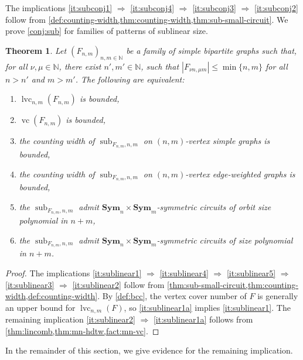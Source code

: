 \documentclass[11pt, DIV=15]{scrarticle}
\theoremstyle{definition}
\theoremstyle{plain}
\newtheorem{theorem}[definition]{Theorem}
\theoremstyle{remark}
\DeclareMathOperator{\sub}{sub}
\DeclareMathOperator{\vc}{vc}
\DeclareMathOperator{\cc}{lvc}
\newcommand{\Sym}{\mathbf{Sym}}
\begin{document}
	The implications \ref{it:subconj1} $\Rightarrow$ \ref{it:subconj4} $\Rightarrow$ \ref{it:subconj3} $\Rightarrow$ \ref{it:subconj2} follow from \cref{def:counting-width,thm:counting-width,thm:sub-small-circuit}.
	We prove \cref{conj:sub} for families of patterns of sublinear size.
	\begin{theorem}
		\label{thm:sublinear}
		Let $(F_{n,m})_{n,m \in \mathbb{N}}$ be a family of simple bipartite graphs such that, 
		for all $\nu, \mu \in \mathbb{N}$,
		there exist $n',m' \in \mathbb{N}$,
		such that $|F_{\nu n, \mu m}| \leq \min \{n,m\}$ for all $n > n'$ and $m > m'$.
		The following are equivalent:
		\begin{enumerate}
			\item $\cc_{n,m}(F_{n,m})$ is bounded,\label{it:sublinear1}
			\item $\vc(F_{n,m})$ is bounded,\label{it:sublinear1a}
			\item the counting width of $\sub_{F_{n,m},n,m}$ on $(n,m)$-vertex simple graphs is bounded,\label{it:sublinear2}
			\item the counting width of $\sub_{F_{n,m},n,m}$ on $(n,m)$-vertex edge-weighted graphs is bounded,\label{it:sublinear3}
			\item the $\sub_{F_{n,m}, n, m}$ admit $\Sym_n \times \Sym_m$-symmetric circuits of orbit size polynomial in $n+m$,\label{it:sublinear5}
			\item the $\sub_{F_{n,m}, n, m}$ admit $\Sym_n \times \Sym_m$-symmetric circuits of size polynomial in $n+m$.\label{it:sublinear4}
		\end{enumerate}
	\end{theorem}
	

	\begin{proof}
		The implications \ref{it:sublinear1} $\Rightarrow$ \ref{it:sublinear4} $\Rightarrow$ \ref{it:sublinear5} $\Rightarrow$ \ref{it:sublinear3} $\Rightarrow$ \ref{it:sublinear2} follow from \cref{thm:sub-small-circuit,thm:counting-width,def:counting-width}.
		By \cref{def:bcc}, the vertex cover number of $F$ is generally an upper bound for $\cc_{n,m}(F)$, so \ref{it:sublinear1a} implies \ref{it:sublinear1}. 
		The remaining implication \ref{it:sublinear2} $\Rightarrow$ \ref{it:sublinear1a} follows from \cref{thm:lincomb,thm:mn-hdtw,fact:mn-vc}.
	\end{proof}
	
	In the remainder of this section,
	we give evidence for the remaining implication.
	
	
\end{document}
